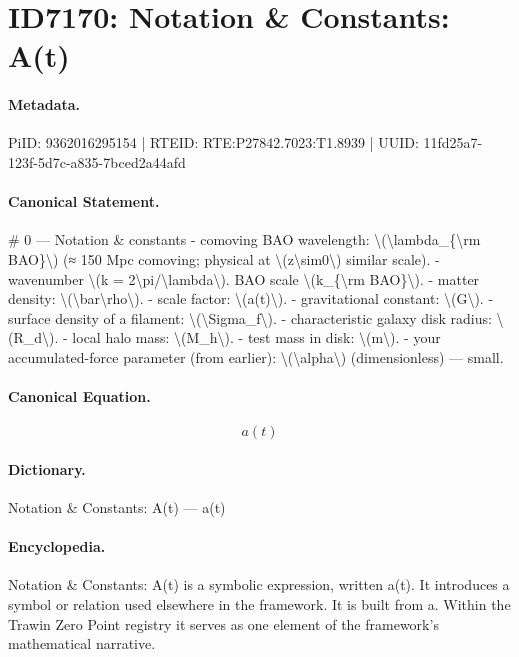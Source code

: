 \section*{ID7170: Notation \& Constants: A(t)}
\paragraph{Metadata.}
PiID: 9362016295154 | RTEID: RTE:P27842.7023:T1.8939 | UUID: 11fd25a7-123f-5d7c-a835-7bced2a44afd

\paragraph{Canonical Statement.}
\# 0 — Notation \& constants - comoving BAO wavelength: \textbackslash{}(\textbackslash{}lambda\_\{\textbackslash{}rm BAO\}\textbackslash{}) (≈ 150 Mpc comoving; physical at \textbackslash{}(z\textbackslash{}sim0\textbackslash{}) similar scale). - wavenumber \textbackslash{}(k = 2\textbackslash{}pi/\textbackslash{}lambda\textbackslash{}). BAO scale \textbackslash{}(k\_\{\textbackslash{}rm BAO\}\textbackslash{}). - matter density: \textbackslash{}(\textbackslash{}bar\textbackslash{}rho\textbackslash{}). - scale factor: \textbackslash{}(a(t)\textbackslash{}). - gravitational constant: \textbackslash{}(G\textbackslash{}). - surface density of a filament: \textbackslash{}(\textbackslash{}Sigma\_f\textbackslash{}). - characteristic galaxy disk radius: \textbackslash{}(R\_d\textbackslash{}). - local halo mass: \textbackslash{}(M\_h\textbackslash{}). - test mass in disk: \textbackslash{}(m\textbackslash{}). - your accumulated-force parameter (from earlier): \textbackslash{}(\textbackslash{}alpha\textbackslash{}) (dimensionless) — small.

\paragraph{Canonical Equation.}
\[
a(t)
\]

\paragraph{Dictionary.}
Notation \& Constants: A(t) — a(t)

\paragraph{Encyclopedia.}
Notation \& Constants: A(t) is a symbolic expression, written a(t). It introduces a symbol or relation used elsewhere in the framework. It is built from a. Within the Trawin Zero Point registry it serves as one element of the framework's mathematical narrative.
